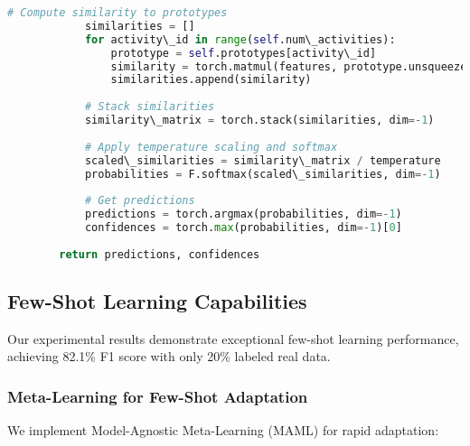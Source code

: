 \documentclass[journal]{IEEEtran}
\begin{document}
\begin{lstlisting}[language=Python, caption=Prototype-Based Zero-Shot Learning]
            # Compute similarity to prototypes
            similarities = []
            for activity\_id in range(self.num\_activities):
                prototype = self.prototypes[activity\_id]
                similarity = torch.matmul(features, prototype.unsqueeze(-1)).squeeze(-1)
                similarities.append(similarity)
            
            # Stack similarities
            similarity\_matrix = torch.stack(similarities, dim=-1)
            
            # Apply temperature scaling and softmax
            scaled\_similarities = similarity\_matrix / temperature
            probabilities = F.softmax(scaled\_similarities, dim=-1)
            
            # Get predictions
            predictions = torch.argmax(probabilities, dim=-1)
            confidences = torch.max(probabilities, dim=-1)[0]
        
        return predictions, confidences
\end{lstlisting}

\subsection{Few-Shot Learning Capabilities}

Our experimental results demonstrate exceptional few-shot learning performance, achieving 82.1\% F1 score with only 20\% labeled real data.

\subsubsection{Meta-Learning for Few-Shot Adaptation}

We implement Model-Agnostic Meta-Learning (MAML) for rapid adaptation:
\end{document}
